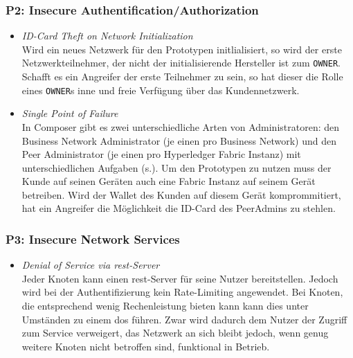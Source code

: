        \subsubsection*{P2: Insecure Authentification/Authorization}
            \begin{itemize}[leftmargin=0cm,label={}]
    	        \item \emph{ID-Card Theft on Network Initialization}\label{vuln:prototype_id_theft}\\
    	            Wird ein neues Netzwerk für den Prototypen initlialisiert, so wird der erste Netzwerkteilnehmer, der nicht der initialisierende Hersteller ist zum \colorbox{light-gray}{\lstinline{OWNER}}. 
    	            Schafft es ein Angreifer der erste Teilnehmer zu sein, so hat dieser die Rolle eines \colorbox{light-gray}{\lstinline{OWNER}}s inne und freie Verfügung über das Kundennetzwerk.
    	        \item \emph{Single Point of Failure}\label{vuln:prototype_spf}\\
                    In Composer gibt es zwei unterschiedliche Arten von Administratoren: den Business Network Administrator (je einen pro Business Network) und den Peer Administrator (je einen pro Hyperledger Fabric Instanz) mit unterschiedlichen Aufgaben (s.). 
                    Um den Prototypen zu nutzen muss der Kunde auf seinen Geräten auch eine Fabric Instanz auf seinem Gerät betreiben. 
                    Wird der Wallet des Kunden auf diesem Gerät komprommitiert, hat ein Angreifer die Möglichkeit die ID-Card des PeerAdmins zu stehlen. 
            \end{itemize}
            
        \subsubsection*{P3: Insecure Network Services}
            \begin{itemize}[leftmargin=0cm,label={}]
                \item \emph{Denial of Service via \gls{rest}-Server}\label{vuln:prototype_dos}\\
        	        Jeder Knoten kann einen \gls{rest}-Server für seine Nutzer bereitstellen. 
        	        Jedoch wird bei der Authentifizierung kein Rate-Limiting angewendet. 
        	        Bei Knoten, die entsprechend wenig Rechenleistung bieten kann kann dies unter Umständen zu einem \gls{dos} führen. 
        	        Zwar wird dadurch dem Nutzer der Zugriff zum Service verweigert, das Netzwerk an sich bleibt jedoch, wenn genug weitere Knoten nicht betroffen sind, funktional in Betrieb.
            \end{itemize}
            
